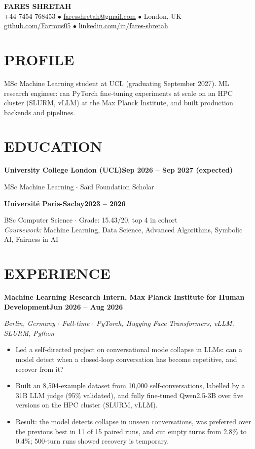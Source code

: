 \documentclass[10pt, a4paper]{article}
\newcommand{\entry}[2]{\vspace{5pt}\textbf{#1}\hfill\textbf{#2}\par}
\newcommand{\sub}[1]{\textit{#1}\par}
\begin{document}
\begin{center}
    {\huge \textbf{FARES SHRETAH}} \\[3pt]
    \small +44 7454 768453 $\bullet$ \href{mailto:faresshretah@gmail.com}{faresshretah@gmail.com} $\bullet$ London, UK \\
    \small \href{https://github.com/Farrous05}{github.com/Farrous05} $\bullet$ \href{https://www.linkedin.com/in/fares-shretah/}{linkedin.com/in/fares-shretah}
\end{center}

\section*{PROFILE}
MSc Machine Learning student at UCL (graduating September 2027). ML research engineer: ran PyTorch fine-tuning experiments at scale on an HPC cluster (SLURM, vLLM) at the Max Planck Institute, and built production backends and pipelines.

\section*{EDUCATION}
\entry{University College London (UCL)}{Sep 2026 -- Sep 2027 (expected)}
MSc Machine Learning $\cdot$ Sa\"id Foundation Scholar

\entry{Universit\'e Paris-Saclay}{2023 -- 2026}
BSc Computer Science $\cdot$ Grade: 15.43/20, top 4 in cohort \\
\textit{Coursework:} Machine Learning, Data Science, Advanced Algorithms, Symbolic AI, Fairness in AI

\section*{EXPERIENCE}
\entry{Machine Learning Research Intern, Max Planck Institute for Human Development}{Jun 2026 -- Aug 2026}
\sub{Berlin, Germany $\cdot$ Full-time $\cdot$ PyTorch, Hugging Face Transformers, vLLM, SLURM, Python}
\begin{itemize}
    \item Led a self-directed project on conversational mode collapse in LLMs: can a model detect when a closed-loop conversation has become repetitive, and recover from it?
    \item Built an 8,504-example dataset from 10,000 self-conversations, labelled by a 31B LLM judge (95\% validated), and fully fine-tuned Qwen2.5-3B over five versions on the HPC cluster (SLURM, vLLM).
    \item Result: the model detects collapse in unseen conversations, was preferred over the previous best in 11 of 15 paired runs, and cut empty turns from 2.8\% to 0.4\%; 500-turn runs showed recovery is temporary.
\end{itemize}
\end{document}
